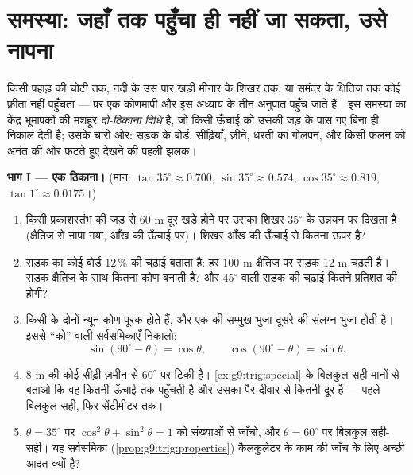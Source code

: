\section{समस्या: जहाँ तक पहुँचा ही नहीं जा सकता, उसे नापना}

\begin{problem}
\label{pb:g9:trig:1}
किसी पहाड़ की चोटी तक, नदी के उस पार खड़ी मीनार के शिखर तक, या समंदर
के क्षितिज तक कोई फ़ीता नहीं पहुँचता --- पर एक कोणमापी और इस अध्याय के
तीन अनुपात पहुँच जाते हैं। इस समस्या का केंद्र भूमापकों की मशहूर
\emph{दो-ठिकाना विधि} है, जो किसी ऊँचाई को उसकी जड़ के पास गए बिना ही
निकाल देती है; उसके चारों ओर: सड़क के बोर्ड, सीढ़ियाँ, ज़ीने, धरती का
गोलपन, और किसी फलन को अनंत की ओर फटते हुए देखने की पहली झलक।

\medskip
\noindent\textbf{भाग I --- एक ठिकाना।}
(मान: $\tan 35^\circ \approx 0.700$,
$\sin 35^\circ \approx 0.574$, $\cos 35^\circ \approx 0.819$,
$\tan 1^\circ \approx 0.0175$।)
\begin{enumerate}
  \item किसी प्रकाशस्तंभ की जड़ से $60$ m दूर खड़े होने पर उसका
        शिखर $35^\circ$ के उन्नयन पर दिखता है (क्षैतिज से नापा गया,
        आँख की ऊँचाई पर)। शिखर आँख की ऊँचाई से कितना ऊपर है?
  \item सड़क का कोई बोर्ड $12\,\%$ की चढ़ाई बताता है: हर $100$ m
        क्षैतिज  पर सड़क $12$ m चढ़ती है। सड़क क्षैतिज के साथ
        कितना कोण बनाती है? और $45^\circ$ वाली सड़क की चढ़ाई कितने
        प्रतिशत की होगी?
  \item किसी  के दोनों न्यून कोण पूरक होते हैं, और एक
        की सम्मुख भुजा दूसरे की संलग्न भुजा होती है। इससे ``को''
        वाली सर्वसमिकाएँ निकालो:
        \[
        \sin(90^\circ - \theta) = \cos\theta,
        \qquad
        \cos(90^\circ - \theta) = \sin\theta .
        \]
  \item $8$ m की कोई सीढ़ी ज़मीन से $60^\circ$ पर टिकी है।
        \cref{ex:g9:trig:special} के बिलकुल सही मानों से बताओ कि वह
        कितनी ऊँचाई तक पहुँचती है और उसका पैर दीवार से कितनी दूर है
        --- पहले बिलकुल सही, फिर सेंटीमीटर तक।
  \item $\theta = 35^\circ$ पर $\cos^2\theta + \sin^2\theta = 1$ को
        संख्याओं से जाँचो, और $\theta = 60^\circ$ पर बिलकुल सही-सही।
        यह सर्वसमिका (\cref{prop:g9:trig:properties}) कैलकुलेटर के
        काम की जाँच के लिए अच्छी आदत क्यों है?
\end{enumerate}


\end{problem}
